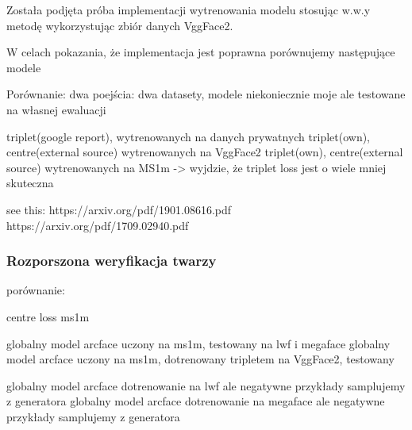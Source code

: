 Została podjęta próba implementacji wytrenowania modelu stosując w.w.y metodę wykorzystując zbiór danych VggFace2. 

W celach pokazania, że implementacja jest poprawna porównujemy następujące modele

Porównanie:
dwa poejścia: dwa datasety, modele niekoniecznie moje ale testowane na własnej ewaluacji

 triplet(google report), wytrenowanych na danych prywatnych
 triplet(own), centre(external source) wytrenowanych na VggFace2
 triplet(own), centre(external source) wytrenowanych na MS1m
-> wyjdzie, że triplet loss jest o wiele mniej skuteczna 

see this:
https://arxiv.org/pdf/1901.08616.pdf
https://arxiv.org/pdf/1709.02940.pdf



\subsubsection{Rozporszona weryfikacja twarzy}
porównanie:

centre loss ms1m


globalny model arcface uczony na ms1m, testowany na lwf i megaface
globalny model arcface uczony na ms1m, dotrenowany tripletem na VggFace2, testowany


globalny model arcface dotrenowanie na lwf ale negatywne przykłady samplujemy z generatora
globalny model arcface dotrenowanie na megaface ale negatywne przykłady samplujemy z generatora




